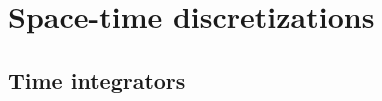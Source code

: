 \documentclass[a4paper,12pt]{article}
\begin{document}
\section{Space-time discretizations}

\subsection{Time integrators}
\end{document}
